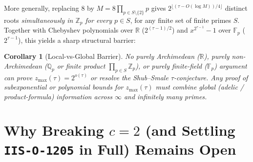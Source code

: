 \documentclass[11pt]{article}
\newtheorem{corollary}[theorem]{Corollary}
\newcommand{\Z}{\mathbb{Z}}
\newcommand{\Q}{\mathbb{Q}}
\newcommand{\R}{\mathbb{R}}
\newcommand{\F}{\mathbb{F}}
\newcommand{\code}[1]{\texttt{#1}}
\newcommand{\zmax}{z_{\max}}
\begin{document}
More generally, replacing $8$ by $M = 8 \prod_{p \in S \setminus \{2\}} p$ gives $2^{\lfloor(\tau - O(\log M))/4\rfloor}$ distinct roots \emph{simultaneously in $\Z_p$ for every $p \in S$}, for any finite set of finite primes $S$. Together with Chebyshev polynomials over $\R$ ($2^{(\tau-1)/2}$) and $x^{2^{\tau-1}} - 1$ over $\F_p$ ($2^{\tau-1}$), this yields a sharp structural barrier:

\begin{corollary}[Local-vs-Global Barrier]
No purely Archimedean ($\R$), purely non-Archimedean ($\Q_p$ or finite product $\prod_{p \in S} \Z_p$), or purely finite-field ($\F_p$) argument can prove $\zmax(\tau) = 2^{o(\tau)}$ or resolve the Shub--Smale $\tau$-conjecture. Any proof of subexponential or polynomial bounds for $\zmax(\tau)$ must combine global (adelic / product-formula) information across $\infty$ and infinitely many primes.
\end{corollary}

\section{Why Breaking $c = 2$ (and Settling \code{IIS-O-1205} in Full) Remains Open}
\end{document}

